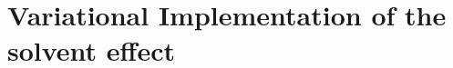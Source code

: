 \documentclass[../master_thesis.tex]{subfiles}
\begin{document}
\chapter{Variational Implementation of the solvent effect}

\biblio
\end{document}
